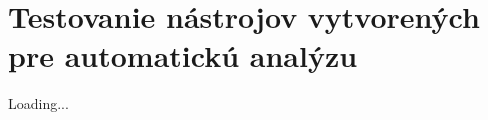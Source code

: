\chapter{Testovanie nástrojov vytvorených pre automatickú analýzu}
\label{tests-for-analysis-tools-created}

Loading...